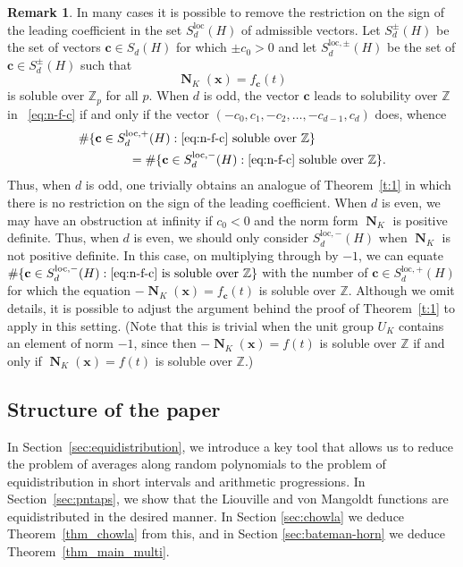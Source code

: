 \documentclass[11pt,letterpaper]{amsart}
\theoremstyle{definition}
\newtheorem{remark}[theorem]{Remark}
\numberwithin{equation}{section}
\newcommand\ZZ{\mathbb{Z}}
\newcommand{\x}{\mathbf{x}}
\renewcommand{\c}{\mathbf{c}}
\DeclareMathOperator{\nf}{\mathbf{N}}
\newcommand{\0}{\mathbf{0}}
\begin{document}
\begin{remark}
In many cases it is possible to remove the restriction on the sign of the leading coefficient in the set 
$S_d^{\text{loc}}(H)$  of admissible vectors. 
Let  $S_d^\pm(H) $ be  the set of  vectors $\c\in S_d(H)$ for which $\pm c_0>0$ and let 
$S_d^{\text{loc},\pm}(H)$  be the 
set of $\c\in S_d^\pm(H)$ such that 
\begin{equation}\label{eq:n-f-c}
\nf_{K}(\mathbf{x})=f_{\mathbf{c}}(t)
\end{equation}
is  soluble over $\ZZ_p$ for all $p$.
When $d$ is odd, the vector $\c$ leads to solubility over $\ZZ$ in ~\eqref{eq:n-f-c} 
if and only if the vector $(-c_0,c_1,-c_2,\dots,-c_{d-1},c_d)$ does, whence
\begin{align*}
&\# \{ \c\in S_d^{\text{loc},+}(H):  \text{\eqref{eq:n-f-c} soluble over $\ZZ$}\}\\
&\qquad\qquad=
\# \{ \c\in S_d^{\text{loc},-}(H): \text{\eqref{eq:n-f-c}  soluble over $\ZZ$}\}.
\end{align*}
Thus, when $d$ is odd,
one trivially obtains an 
analogue of Theorem~\ref{t:1} in which there is  no restriction on the sign of the leading coefficient. 
When $d$ is even, we may have an obstruction at infinity if $c_0<0$ and the norm form  $\nf_K$ is positive definite. Thus, when $d$ is even,  we should only consider 
$S_d^{\text{loc},-}(H)$ when $\nf_K$ is not positive definite. In this case, on multiplying through by $-1$, we can equate 
$\# \{ \c\in S_d^{\text{loc},-}(H): \text{\eqref{eq:n-f-c} is soluble over $\ZZ$}\}$
with the number of $\c\in S_d^{\text{loc},+}(H)$ for which the equation 
$-\nf_K(\x)=f_\c(t)$ is soluble over $\ZZ$. Although we omit details, it is possible to adjust the  argument behind the proof of Theorem~\ref{t:1} to apply in this setting. (Note that this is trivial when the unit group $U_K$ contains an element of norm $-1$, since then 
$-\nf_K(\x)=f(t)$ is soluble over $\ZZ$ if and only if 
$\nf_K(\x)=f(t)$ is soluble over $\ZZ$.)
\end{remark}

\subsection{Structure of the paper}

In Section~\ref{sec:equidistribution}, we introduce a key tool that allows us to reduce the problem of averages along random polynomials to the problem of equidistribution in short intervals and arithmetic progressions. In Section~\ref{sec:pntaps}, we show that the Liouville and von Mangoldt functions are  equidistributed in the desired manner. In Section \ref{sec:chowla} 
we deduce Theorem~\ref{thm_chowla}  from this, and in 
Section \ref{sec:bateman-horn} we deduce Theorem~\ref{thm_main_multi}.
\end{document}
